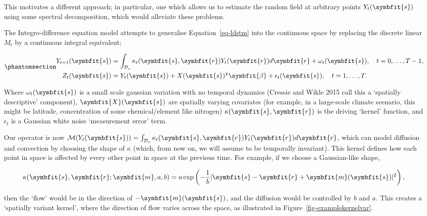 \documentclass[
]{report}
\newcommand{\bv}[1]{\symbfit{#1}}
\theoremstyle{plain}
\theoremstyle{plain}
\theoremstyle{remark}
\begin{document}
This motivates a different approach; in particular, one which allows us
to estimate the random field at arbitrary points \(Y_t(\bv s)\) using
some spectral decomposition, which would alleviate these problems.

The Integro-difference equation model attempts to generalise
Equation~\ref{eq-ldstm} into the continuous space by replacing the
discrete linear \(M_t\) by a continuous integral equivalent;

\begin{equation}\phantomsection\label{eq-IDEM}{\begin{split}
  Y_{t+1}(\bv s) &= \int_{\mathcal D_s} \kappa_t(\bv s,\bv r) Y_t(\bv r) d\bv r + \omega_t(\bv s), \quad t=0, \dots, T-1, \\
  Z_t(\bv s) &= Y_t(\bv s) + X(\bv s)^{\intercal}\bv \beta + \epsilon_t(\bv s), \quad t=1,\dots,T.
\end{split}
}\end{equation}

Where \(\omega_t(\bv s)\) is a small scale gaussian variation with no
temporal dynamics (Cressie and Wikle 2015 call this a `spatially
descriptive' component), \(\bv X(\bv s)\) are spatially varying
covariates (for example, in a large-scale climate scenario, this might
be latitude, concentration of some chemical/element like nitrogen)
\(\kappa(\bv s, \bv r)\) is the driving `kernel' function, and
\(\epsilon_t\) is a Gaussian white noise `measurement error' term.

Our operator is now
\(\mathcal M(Y_t(\bv s)) = \int_{\mathcal D_s} \kappa_t(\bv s,\bv r) Y_t(\bv r) d\bv r\),
which can model diffusion and convection by choosing the shape of
\(\kappa\) (which, from now on, we will assume to be temporally
invariant). This kernel defines how each point in space is affected by
every other point in space at the previous time. For example, if we
choose a Gaussian-like shape,

\[\begin{split}
  \kappa(\bv s, \bv r; \bv m, a, b) = a \exp \left( -\frac{1}{b} \vert \bv s- \bv r +\bv m(\bv s)\vert^2 \right),
\end{split}
\]

then the `flow' would be in the direction of \(-\bv m(\bv s)\), and the
diffusion would be controlled by \(b\) and \(a\). This creates a
`spatially variant kernel', where the direction of flow varies across
the space, as illustrated in Figure~\ref{fig-examplekernelvar}.
\end{document}

